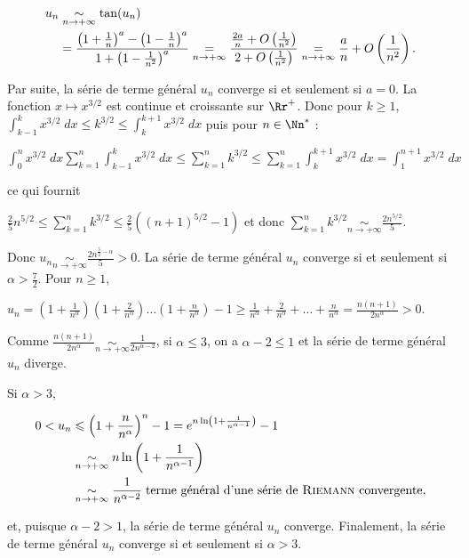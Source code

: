 {{\begin{align*}\ensuremath
u_n&\underset{n\rightarrow+\infty}{\sim}\tan(u_n)\\
 &=\frac{\left(1+\frac{1}{n}\right)^a-\left(1-\frac{1}{n}\right)^a}{1+\left(1-\frac{1}{n^2}\right)^a}\underset{n\rightarrow+\infty}{=}\frac{\frac{2a}{n}+O\left(\frac{1}{n^2}\right)}{2+O\left(\frac{1}{n^2}\right)}\underset{n\rightarrow+\infty}{=}\frac{a}{n}+O\left(\frac{1}{n^2}\right).
\end{align*}

Par suite, la série de terme général $u_n$ converge si et seulement si $a = 0$.
La fonction $x\mapsto x^{3/2}$ est continue et croissante sur $\Rr^+$. Donc pour $k\geqslant 1$, $\int_{k-1}^{k}x^{3/2}\;dx\leqslant k^{3/2}\leqslant\int_{k}^{k+1}x^{3/2}\;dx$ puis pour $n\in\Nn^*$ :

\begin{center}
$\int_{0}^{n}x^{3/2}\;dx\sum_{k=1}^{n}\int_{k-1}^{k}x^{3/2}\;dx\leqslant\sum_{k=1}^{n}k^{3/2}\leqslant\sum_{k=1}^{n}\int_{k}^{k+1}x^{3/2}\;dx=\int_{1}^{n+1}x^{3/2}\;dx$
\end{center}

ce qui fournit

\begin{center}
$\frac{2}{5}n^{5/2}\leqslant\sum_{k=1}^{n}k^{3/2}\leqslant\frac{2}{5}((n+1)^{5/2}-1)$ et donc $\sum_{k=1}^{n}k^{3/2}\underset{n\rightarrow+\infty}{\sim}\frac{2n^{5/2}}{5}$.
\end{center}

Donc $u_n\underset{n\rightarrow+\infty}{\sim}\frac{2n^{\frac{5}{2}-\alpha}}{5}>0$. La série de terme général $u_n$ converge si et seulement si $\alpha>\frac{7}{2}$.
Pour $n\geqslant1$,

\begin{center}
$u_n =\left(1+\frac{1}{n^\alpha}\right)\left(1+\frac{2}{n^\alpha}\right)\ldots\left(1+\frac{n}{n^\alpha}\right)-1\geqslant\frac{1}{n^\alpha}+\frac{2}{n^\alpha}+\ldots+\frac{n}{n^\alpha}=\frac{n(n+1)}{2n^\alpha}>0$.
\end{center}

Comme $\frac{n(n+1)}{2n^\alpha}\underset{n\rightarrow+\infty}{\sim}\frac{1}{2n^{\alpha-2}}$, si $\alpha\leqslant3$, on a $\alpha-2\leqslant1$ et la série de terme général $u_n$ diverge.

Si $\alpha> 3$,

\begin{align*}\ensuremath
0 < u_n&\leqslant\left(1+\frac{n}{n^\alpha}\right)^n -1= e^{n\ln\left(1+\frac{1}{n^{\alpha-1}}\right)}-1\\
 &\underset{n\rightarrow+\infty}{\sim}n\ln\left(1+\frac{1}{n^{\alpha-1}}\right)\\
 &\underset{n\rightarrow+\infty}{\sim}\frac{1}{n^{\alpha-2}}\;\text{terme général d'une série de \textsc{Riemann} convergente},
\end{align*}
			   
			   
et, puisque $\alpha-2>1$,  la série de terme général $u_n$ converge. Finalement, la série de terme général $u_n$ converge si et seulement si $\alpha > 3$.
}
}
